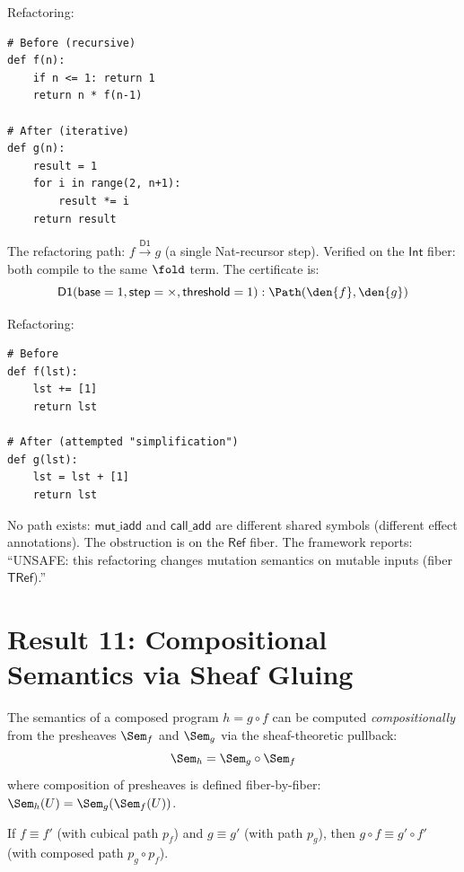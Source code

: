 \begin{example}
Refactoring:
\begin{lstlisting}
# Before (recursive)
def f(n):
    if n <= 1: return 1
    return n * f(n-1)

# After (iterative)
def g(n):
    result = 1
    for i in range(2, n+1):
        result *= i
    return result
\end{lstlisting}

The refactoring path: $f \xrightarrow{\mathsf{D1}} g$ (a single
Nat-recursor step).  Verified on the $\mathsf{Int}$ fiber: both
compile to the same $\fold$ term.  The certificate is:
\[
  \mathsf{D1}(\mathsf{base}=1, \mathsf{step}=\times, \mathsf{threshold}=1)
  : \Path(\den{f}, \den{g})
\]
\end{example}

\begin{example}
Refactoring:
\begin{lstlisting}
# Before
def f(lst):
    lst += [1]
    return lst

# After (attempted "simplification")
def g(lst):
    lst = lst + [1]
    return lst
\end{lstlisting}

No path exists: $\mathsf{mut\_iadd}$ and $\mathsf{call\_add}$ are
different shared symbols (different effect annotations).  The
obstruction is on the $\mathsf{Ref}$ fiber.  The framework reports:
``UNSAFE: this refactoring changes mutation semantics on mutable
inputs (fiber $\mathsf{TRef}$).''
\end{example}

\section{Result 11: Compositional Semantics via Sheaf Gluing}

\begin{theorem}
\label{thm:compositional}
The semantics of a composed program $h = g \circ f$ can be computed
\emph{compositionally} from the presheaves $\Sem_f$ and $\Sem_g$
via the sheaf-theoretic pullback:
\[
  \Sem_h = \Sem_g \circ \Sem_f
\]
where composition of presheaves is defined fiber-by-fiber:
$\Sem_h(U) = \Sem_g(\Sem_f(U))$.

If $f \equiv f'$ (with cubical path $p_f$) and $g \equiv g'$
(with path $p_g$), then $g \circ f \equiv g' \circ f'$ (with
composed path $p_g \circ p_f$).
\end{theorem}

